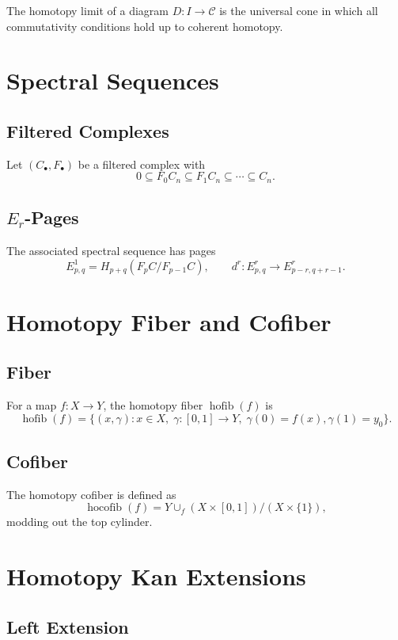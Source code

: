 The homotopy limit of a diagram $D:I\to \mathcal{C}$ is the universal cone in which all commutativity conditions hold up to coherent homotopy.

\section{Spectral Sequences}

\subsection{Filtered Complexes}

Let $(C_\bullet,F_\bullet)$ be a filtered complex with
\[
0 \subseteq F_0 C_n \subseteq F_1 C_n \subseteq \cdots \subseteq C_n.
\]

\subsection{$E_r$-Pages}

The associated spectral sequence has pages
\[
E^1_{p,q} = H_{p+q}(F_p C / F_{p-1}C),
\qquad
d^r : E^r_{p,q} \to E^r_{p-r,q+r-1}.
\]

\section{Homotopy Fiber and Cofiber}

\subsection{Fiber}

For a map $f:X\to Y$, the homotopy fiber $\operatorname{hofib}(f)$ is
\[
\operatorname{hofib}(f)
  = \{(x,\gamma) : x\in X,\; \gamma:[0,1]\to Y,\; \gamma(0)=f(x),\gamma(1)=y_0\}.
\]

\subsection{Cofiber}

The homotopy cofiber is defined as
\[
\operatorname{hocofib}(f)
  = Y \cup_f (X\times[0,1]) / (X\times\{1\}),
\]
modding out the top cylinder.

\section{Homotopy Kan Extensions}

\subsection{Left Extension}

